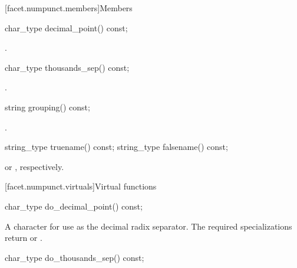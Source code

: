 [facet.numpunct.members]{Members}

%
\begin{itemdecl}
char_type decimal_point() const;
\end{itemdecl}

\begin{itemdescr}
\pnum
\returns
{}.
\end{itemdescr}

%
\begin{itemdecl}
char_type thousands_sep() const;
\end{itemdecl}

\begin{itemdescr}
\pnum
\returns
{}.
\end{itemdescr}

%
\begin{itemdecl}
string grouping() const;
\end{itemdecl}

\begin{itemdescr}
\pnum
\returns
{}.
\end{itemdescr}

%
%
\begin{itemdecl}
string_type truename()  const;
string_type falsename() const;
\end{itemdecl}

\begin{itemdescr}
\pnum
\returns
{}
or
,
respectively.
\end{itemdescr}

[facet.numpunct.virtuals]{Virtual functions}

%
\begin{itemdecl}
char_type do_decimal_point() const;
\end{itemdecl}

\begin{itemdescr}
\pnum
\returns
A character for use as the decimal radix separator.
The required specializations return  or .
\end{itemdescr}

%
\begin{itemdecl}
char_type do_thousands_sep() const;
\end{itemdecl}

